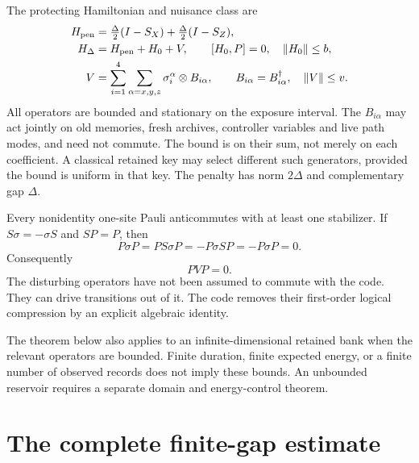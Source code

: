 \documentclass[11pt,oneside,openany]{book}
\theoremstyle{definition}
\theoremstyle{remark}\newtheorem{remark}[theorem]{Remark}
\begin{document}
The protecting Hamiltonian and nuisance class are
\begin{align}
 H_{\rm pen}&=\tfrac\Delta2(I-S_X)+\tfrac\Delta2(I-S_Z),\\
 H_\Delta&=H_{\rm pen}+H_0+V,\qquad
 [H_0,P]=0,\quad\|H_0\|\le b,\\
 V&=\sum_{i=1}^4\sum_{\alpha=x,y,z}
               \sigma_i^\alpha\otimes B_{i\alpha},
 \qquad B_{i\alpha}=B_{i\alpha}^\dagger,\quad\|V\|\le v.
 \label{prot:model}
\end{align}
All operators are bounded and stationary on the exposure interval. The $B_{i\alpha}$ may act jointly on old memories, fresh archives, controller variables and live path modes, and need not commute. The bound is on their sum, not merely on each coefficient. A classical retained key may select different such generators, provided the bound is uniform in that key. The penalty has norm $2\Delta$ and complementary gap $\Delta$.

Every nonidentity one-site Pauli anticommutes with at least one stabilizer. If $S\sigma=-\sigma S$ and $SP=P$, then
\[
 P\sigma P=PS\sigma P=-P\sigma SP=-P\sigma P=0.
\]
Consequently
\begin{equation}
 PVP=0.
 \label{prot:compressionzero}
\end{equation}
The disturbing operators have not been assumed to commute with the code. They can drive transitions out of it. The code removes their first-order logical compression by an explicit algebraic identity.

The theorem below also applies to an infinite-dimensional retained bank when the relevant operators are bounded. Finite duration, finite expected energy, or a finite number of observed records does not imply these bounds. An unbounded reservoir requires a separate domain and energy-control theorem.

\section{The complete finite-gap estimate}
\end{document}
